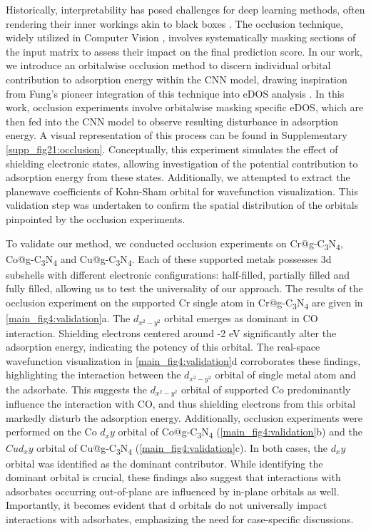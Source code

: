 Historically, interpretability has posed challenges for deep learning methods, often rendering their inner workings akin to black boxes \cite{zhang2018interpretable, zhang2018visual, savage2022breaking}.
The occlusion technique, widely utilized in Computer Vision \cite{zeiler2014visualizing, kortylewski2020combining, wang2020robust}, involves systematically masking sections of the input matrix to assess their impact on the final prediction score.
In our work, we introduce an orbitalwise occlusion method to discern individual orbital contribution to adsorption energy within the CNN model, drawing inspiration from Fung's pioneer integration of this technique into eDOS analysis \cite{fung2021machine}.
In this work, occlusion experiments involve orbitalwise masking specific eDOS, which are then fed into the CNN model to observe resulting disturbance in adsorption energy.
A visual representation of this process can be found in Supplementary \cref{supp_fig21:occlusion}. Conceptually, this experiment simulates the effect of shielding electronic states, allowing investigation of the potential contribution to adsorption energy from these states.
Additionally, we attempted to extract the planewave coefficients of Kohn-Sham orbital for wavefunction visualization.
This validation step was undertaken to confirm the spatial distribution of the orbitals pinpointed by the occlusion experiments.

To validate our method, we conducted occlusion experiments on Cr@g-C\textsubscript{3}N\textsubscript{4}, Co@g-C\textsubscript{3}N\textsubscript{4} and Cu@g-C\textsubscript{3}N\textsubscript{4}.
Each of these supported metals possesses 3d subshells with different electronic configurations: half-filled, partially filled and fully filled, allowing us to test the universality of our approach.
The results of the occlusion experiment on the supported Cr single atom in Cr@g-C\textsubscript{3}N\textsubscript{4} are given in \cref{main_fig4:validation}a.
The $d_{x^2-y^2}$ orbital emerges as dominant in CO interaction.
Shielding electrons centered around -2 eV significantly alter the adsorption energy, indicating the potency of this orbital.
The real-space wavefunction visualization in \cref{main_fig4:validation}d corroborates these findings, highlighting the interaction between the $d_{x^2-y^2}$ orbital of single metal atom and the adsorbate.
This suggests the $d_{x^2-y^2}$ orbital of supported Co predominantly influence the interaction with CO, and thus shielding electrons from this orbital markedly disturb the adsorption energy.
Additionally, occlusion experiments were performed on the Co $d_xy$ orbital of Co@g-C\textsubscript{3}N\textsubscript{4} (\cref{main_fig4:validation}b) and the $Cu d_xy$ orbital of Cu@g-C\textsubscript{3}N\textsubscript{4} (\cref{main_fig4:validation}c).
In both cases, the $d_xy$ orbital was identified as the dominant contributor.
While identifying the dominant orbital is crucial, these findings also suggest that interactions with adsorbates occurring out-of-plane are influenced by in-plane orbitals as well.
Importantly, it becomes evident that d orbitals do not universally impact interactions with adsorbates, emphasizing the need for case-specific discussions.

